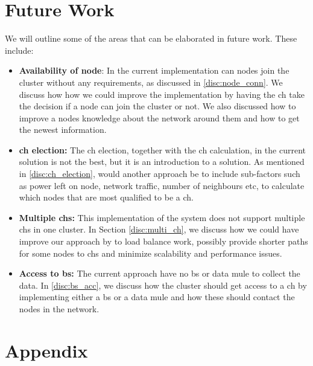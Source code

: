 \documentclass[USenglish]{uit-thesis}
\begin{document}
\chapter{Future Work}
\glsresetall
We will outline some of the areas that can be elaborated in future work. These include:

\begin{itemize}
\item \textbf{Availability of node}: In the current implementation can nodes join the cluster without any requirements, as discussed in \autoref{disc:node_conn}. We discuss how  how we could improve the implementation by having the \gls{ch} take the decision if a node can join the cluster or not. We also discussed how to improve a nodes knowledge about the network around them and how to get the newest information.

\item \textbf{\gls{ch} election:} The \gls{ch} election, together with the \gls{ch} calculation, in the current solution is not the best, but it is an introduction to a solution. As mentioned in \autoref{disc:ch_election}, would another approach be to include sub-factors such as power left on node, network traffic, number of neighbours etc, to calculate which nodes that are most qualified to be a \gls{ch}. 

\item \textbf{Multiple \glspl{ch}:} This implementation of the system does not support multiple \glspl{ch} in one cluster. In Section \autoref{disc:multi_ch}, we discuss how we could have improve our approach by to load balance work, possibly provide shorter paths for some nodes to \glspl{ch} and minimize scalability and performance issues.

\item \textbf{Access to \gls{bs}:} The current approach have no \gls{bs} or data mule to collect the data. In \autoref{disc:bs_acc}, we discuss how the cluster should get access to a \gls{ch} by implementing either a \gls{bs} or a data mule and how these should contact the nodes in the network.

\end{itemize}



\chapter{Appendix}
\end{document}

